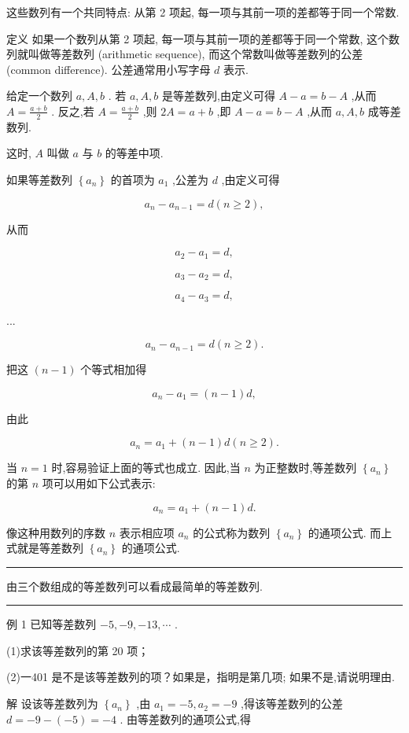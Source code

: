 \documentclass[10pt]{article}
\newcommand{\HRule}{\begin{center}\rule{0.9\linewidth}{0.2mm}\end{center}}
\begin{document}
这些数列有一个共同特点: 从第 2 项起, 每一项与其前一项的差都等于同一个常数.

定义 如果一个数列从第 2 项起, 每一项与其前一项的差都等于同一个常数, 这个数列就叫做等差数列 (arithmetic sequence), 而这个常数叫做等差数列的公差 (common difference). 公差通常用小写字母 \(d\) 表示.

给定一个数列 \(a,A,b\) . 若 \(a,A,b\) 是等差数列,由定义可得 \(A - a = b - A\) ,从而 \(A = \frac{a + b}{2}\) . 反之,若 \(A = \frac{a + b}{2}\) ,则 \({2A} = a + b\) ,即 \(A - a = b - A\) ,从而 \(a,A,b\) 成等差数列.

这时, \(A\) 叫做 \(a\) 与 \(b\) 的等差中项.

如果等差数列 \(\left\{  {a}_{n}\right\}\) 的首项为 \({a}_{1}\) ,公差为 \(d\) ,由定义可得

\[
{a}_{n} - {a}_{n - 1} = d\left( {n \geq  2}\right) ,
\]

从而

\[
{a}_{2} - {a}_{1} = d,
\]

\[
{a}_{3} - {a}_{2} = d,
\]

\[
{a}_{4} - {a}_{3} = d,
\]

...

\[
{a}_{n} - {a}_{n - 1} = d\left( {n \geq  2}\right) .
\]

把这 \(\left( {n - 1}\right)\) 个等式相加得

\[
{a}_{n} - {a}_{1} = \left( {n - 1}\right) d,
\]

由此

\[
{a}_{n} = {a}_{1} + \left( {n - 1}\right) d\left( {n \geq  2}\right) .
\]

当 \(n = 1\) 时,容易验证上面的等式也成立. 因此,当 \(n\) 为正整数时,等差数列 \(\left\{  {a}_{n}\right\}\) 的第 \(n\) 项可以用如下公式表示:

\[
{a}_{n} = {a}_{1} + \left( {n - 1}\right) d.
\]

像这种用数列的序数 \(n\) 表示相应项 \({a}_{n}\) 的公式称为数列 \(\left\{  {a}_{n}\right\}\) 的通项公式. 而上式就是等差数列 \(\left\{  {a}_{n}\right\}\) 的通项公式.

\HRule

由三个数组成的等差数列可以看成最简单的等差数列.

\HRule

例 1 已知等差数列 \(- 5, - 9, - {13},\cdots\) .

(1)求该等差数列的第 20 项；

(2)一401 是不是该等差数列的项？如果是，指明是第几项; 如果不是,请说明理由.

解 设该等差数列为 \(\left\{  {a}_{n}\right\}\) ,由 \({a}_{1} =  - 5,{a}_{2} =  - 9\) ,得该等差数列的公差 \(d =  - 9 - \left( {-5}\right)  =  - 4\) . 由等差数列的通项公式,得
\end{document}
